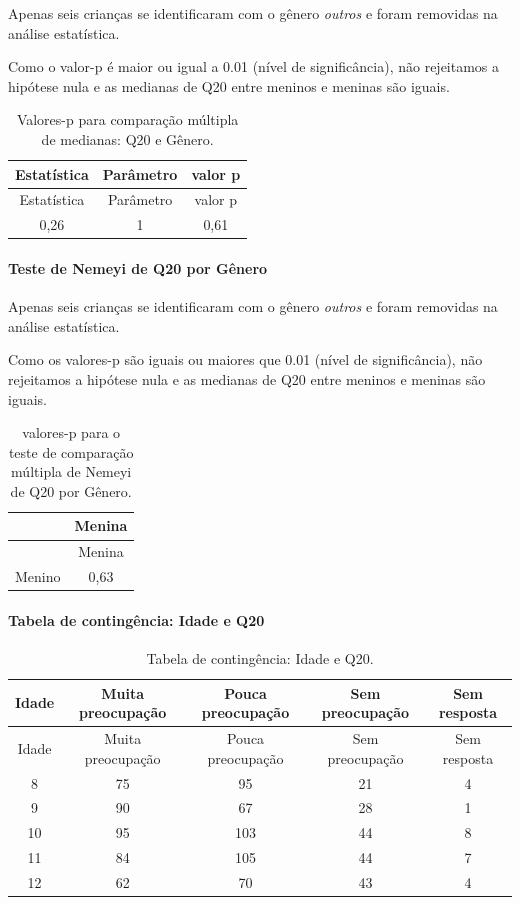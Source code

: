 \documentclass[]{article}
\let\oldparagraph\paragraph
\renewcommand{\paragraph}[1]{\oldparagraph{#1}\mbox{}}
\begin{document}
Apenas seis crianças se identificaram com o gênero \emph{outros} e foram removidas na análise estatística.

Como o valor-p é maior ou igual a 0.01 (nível de significância), não rejeitamos a hipótese nula e as medianas de Q20 entre meninos e meninas são iguais.

\begin{longtable}[]{@{}ccc@{}}
\caption{\label{tab:unnamed-chunk-384}Valores-p para comparação múltipla de medianas: Q20 e Gênero.}\tabularnewline
\toprule
Estatística & Parâmetro & valor p\tabularnewline
\midrule
\endfirsthead
\toprule
Estatística & Parâmetro & valor p\tabularnewline
\midrule
\endhead
0,26 & 1 & 0,61\tabularnewline
\bottomrule
\end{longtable}

\hypertarget{teste-de-nemeyi-de-q20-por-guxeanero}{%
\paragraph{Teste de Nemeyi de Q20 por Gênero}\label{teste-de-nemeyi-de-q20-por-guxeanero}}

Apenas seis crianças se identificaram com o gênero \emph{outros} e foram removidas na análise estatística.

Como os valores-p são iguais ou maiores que 0.01 (nível de significância), não rejeitamos a hipótese nula e as medianas de Q20 entre meninos e meninas são iguais.

\begin{longtable}[]{@{}lc@{}}
\caption{\label{tab:unnamed-chunk-386}valores-p para o teste de comparação múltipla de Nemeyi de Q20 por Gênero.}\tabularnewline
\toprule
& Menina\tabularnewline
\midrule
\endfirsthead
\toprule
& Menina\tabularnewline
\midrule
\endhead
Menino & 0,63\tabularnewline
\bottomrule
\end{longtable}

\cleardoublepage

\hypertarget{tabela-de-continguxeancia-idade-e-q20}{%
\paragraph{Tabela de contingência: Idade e Q20}\label{tabela-de-continguxeancia-idade-e-q20}}

\begin{longtable}[]{@{}ccccc@{}}
\caption{\label{tab:unnamed-chunk-387}Tabela de contingência: Idade e Q20.}\tabularnewline
\toprule
Idade & Muita preocupação & Pouca preocupação & Sem preocupação & Sem resposta\tabularnewline
\midrule
\endfirsthead
\toprule
Idade & Muita preocupação & Pouca preocupação & Sem preocupação & Sem resposta\tabularnewline
\midrule
\endhead
8 & 75 & 95 & 21 & 4\tabularnewline
9 & 90 & 67 & 28 & 1\tabularnewline
10 & 95 & 103 & 44 & 8\tabularnewline
11 & 84 & 105 & 44 & 7\tabularnewline
12 & 62 & 70 & 43 & 4\tabularnewline
\bottomrule
\end{longtable}
\end{document}
